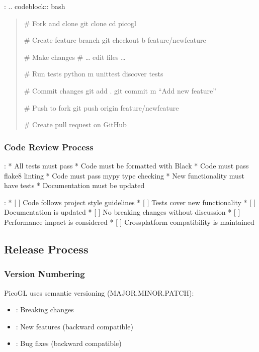 \documentclass[a4paper,10pt,english,openany,oneside]{sphinxmanual}
\begin{document}
\sphinxAtStartPar
{}:
.. code\sphinxhyphen{}block:: bash
\begin{quote}

\sphinxAtStartPar
\# Fork and clone
git clone 
cd picogl

\sphinxAtStartPar
\# Create feature branch
git checkout \sphinxhyphen{}b feature/new\sphinxhyphen{}feature

\sphinxAtStartPar
\# Make changes
\# … edit files …

\sphinxAtStartPar
\# Run tests
python \sphinxhyphen{}m unittest discover tests

\sphinxAtStartPar
\# Commit changes
git add .
git commit \sphinxhyphen{}m “Add new feature”

\sphinxAtStartPar
\# Push to fork
git push origin feature/new\sphinxhyphen{}feature

\sphinxAtStartPar
\# Create pull request on GitHub
\end{quote}


\subsubsection{Code Review Process}
\label{\detokenize{development:code-review-process}}
\sphinxAtStartPar
{}:
* All tests must pass
* Code must be formatted with Black
* Code must pass flake8 linting
* Code must pass mypy type checking
* New functionality must have tests
* Documentation must be updated

\sphinxAtStartPar
{}:
* {[} {]} Code follows project style guidelines
* {[} {]} Tests cover new functionality
* {[} {]} Documentation is updated
* {[} {]} No breaking changes without discussion
* {[} {]} Performance impact is considered
* {[} {]} Cross\sphinxhyphen{}platform compatibility is maintained


\subsection{Release Process}
\label{\detokenize{development:release-process}}

\subsubsection{Version Numbering}
\label{\detokenize{development:version-numbering}}
\sphinxAtStartPar
PicoGL uses semantic versioning (MAJOR.MINOR.PATCH):
\begin{itemize}
\item {} 
\sphinxAtStartPar
{}: Breaking changes

\item {} 
\sphinxAtStartPar
{}: New features (backward compatible)

\item {} 
\sphinxAtStartPar
{}: Bug fixes (backward compatible)

\end{itemize}
\end{document}
